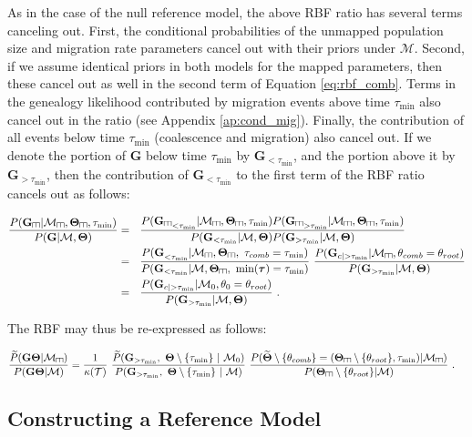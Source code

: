 \documentclass[11pt]{article}
\newcommand{\vect}[1]{\boldsymbol{\mathbf{#1}}}
\newcommand{\M}{\mathcal{M}}
\newcommand{\Tr}{\mathcal{T}}
\newcommand{\G}{\vect{G}}
\newcommand{\T}{\vect{\Theta}}
\newcommand{\GT}{\G\T}
\newcommand{\Pref}{\widetilde{P}}
\newcommand{\Tref}{\widetilde{\T}}
\newcommand{\1}{\mathbbm{1}}
\newcommand{\troot}{\theta_{root}}
\def\comb{\rotatebox[origin=c]{90}{$\exists$}}
\newcommand{\Mcomb}{\M_{\comb}}
\newcommand{\Gcomb}{\G_{\comb}}
\newcommand{\Tcomb}{\T_{\comb}}
\newcommand{\tmin}{\tau_{\text{min}}}
\newcommand{\taus}{\vect\tau}
\newcommand{\thcomb}{\theta_{comb}}
\newcommand{\tacomb}{\tau_{comb}}
\def\comb{\rotatebox[origin=c]{90}{$\exists$}}
\begin{document}
As in the case of the null reference model, the above RBF ratio has several terms canceling out. First, the conditional probabilities of the unmapped population size and
migration rate parameters cancel out with their priors under $\M$. Second, if we assume identical priors in both models for the mapped parameters,
then these cancel out as well in the second term of Equation \ref{eq:rbf_comb}.
Terms in the genealogy likelihood contributed by migration events above time $\tmin$ also cancel out in the ratio (see Appendix \ref{ap:cond_mig}).
Finally, the contribution of all events below time $\tmin$ (coalescence and migration) also cancel out.
If we denote the portion of $\G$ below time $\tmin$ by $\G_{<\tmin}$, and the portion above it by $\G_{>\tmin}$, then the contribution of $\G_{<\tmin}$ 
to the first term of the RBF ratio cancels out as follows:
%
%
\begin{small}
\begin{align}
\frac{ P(\Gcomb|\Mcomb,\Tcomb,\tmin) }{ P(\G|\M,\T)}
&=~~ \frac{ {P(\Gcomb}_{<\tmin}|\Mcomb,\Tcomb,\tmin) P({\Gcomb}_{>\tmin}|\Mcomb,\Tcomb,\tmin) }{ P(\G_{<\tmin}|\M,\T) P(\G_{>\tmin}|\M,\T)}   \notag \\
&=~~ \frac{ {P(\G}_{<\tmin}|\Mcomb,\Tcomb,~\tacomb=\tmin)}{ P(\G_{<\tmin}|\M,\Tcomb,~\min(\taus)=\tmin)} ~\frac{ P({\G}_{c|>\tmin}|\Mcomb,\thcomb=\troot) }{ P(\G_{>\tmin}|\M,\T)}   \notag \\
&=~~ \frac{ P({\G}_{c|>\tmin}|\M_0,\theta_0=\troot) }{ P(\G_{>\tmin}|\M,\T)} ~.  \label{eq:gen_ratio_comb}
\end{align}
\end{small}

The RBF may thus be re-expressed as follows:
%
%
\begin{small}
\begin{align}
\frac{\Pref(\GT|\Mcomb) }{P(\GT|\M)}
&= \frac{1}{\kappa(\Tr)} ~
   \frac{\Pref(\G_{>\tmin},\ \T\setminus\{\tmin\}\ |\ \M_0) }{P(\G_{>\tmin},\ \T\setminus\{\tmin\}\ |\ \M)} ~
   \frac{ P(\Tref\setminus\{\thcomb\}=(\Tcomb\setminus\{\troot\},\tmin)|\Mcomb) }{ P(\Tcomb\setminus\{\troot\}|\M) }~. \label{eq:rbf_comb1}
\end{align}
\end{small}



\subsection{Constructing a Reference Model}  \label{Constructing a Reference Model}
\end{document}
